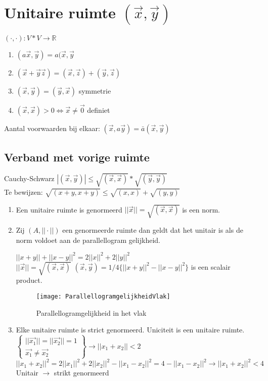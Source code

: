 \section{Unitaire ruimte $( \vec{x},\vec{y} ) $}
$(\cdot,\cdot):V*V \rightarrow \mathbb{R}$
\begin{enumerate}
\item $(a\vec{x},\vec{y})=a(\vec{x},\vec{y}$
\item $(\vec{x}+\vec{y}\vec{z})=(\vec{x},\vec{z})+(\vec{y},\vec{z})$
\item $(\vec{x},\vec{y})=(\vec{y},\vec{x})$ symmetrie
\item $(\vec{x},\vec{x}) > 0 \iff \vec{x} \neq \vec{0}$ definiet
\end{enumerate}
Aantal voorwaarden bij elkaar: $(\vec{x},a\vec{y})=\bar{a}(\vec{x},\vec{y})$

\subsection{Verband met vorige ruimte}
Cauchy-Schwarz $|(\vec{x},\vec{y})| \leq \sqrt{(\vec{x},\vec{x})}*\sqrt{(\vec{y},\vec{y})}$ \\
Te bewijzen: $\sqrt{(x+y,x+y)} \leq \sqrt{(x,x)}+\sqrt{(y,y)}$
\begin{enumerate}
\item Een unitaire ruimte is genormeerd $||\vec{x}||=\sqrt{(\vec{x},\vec{x})}$ is een norm.
\item Zij $(A,||\cdot||)$ een genormeerde ruimte dan geldt dat het unitair is als de norm voldoet aan de parallellogram gelijkheid. \\
\begin{form}
$ ||x+y||+||x-y||^2=2||x||^2+2||y||^2$ \\
$||\vec{x}|| = \sqrt{(\vec{x},\vec{x})}$
$(\vec{x},\vec{y})=1/4\{||x+y||^2-||x-y||^2\}$ is een scalair product.
\begin{figure}[h]
	\centering
	\texttt{[image: ParallellogramgelijkheidVlak]}
	\caption{Parallellogramgelijkheid in het vlak}
\end{figure}
\end{form}
\item Elke unitaire ruimte is strict genormeerd. Uniciteit is een unitaire ruimte. \\
$\left\{ \begin{array}{ll} ||\vec{x_1}||=||\vec{x_2}||=1\\ \vec{x_1} \neq \vec{x_2} \end{array} \right\} \rightarrow ||x_1 +x_2 || < 2$ \\
$|| x_1+x_2||^2 = 2||x_1||^2+2||x_2||^2-||x_1-x_2||^2 = 4- ||x_1-x_2||^2 \rightarrow ||x_1 +x_2 ||^2 < 4$ \\
Unitair $\rightarrow$ strikt genormeerd
\end{enumerate}

